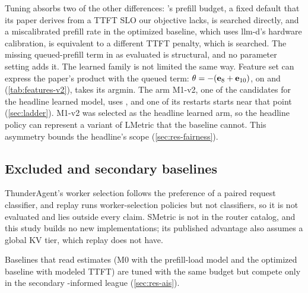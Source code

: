 Tuning absorbs two of the other differences: 's prefill budget, a fixed default that
its paper derives from a TTFT SLO our objective lacks, is searched directly, and a miscalibrated
prefill rate in the optimized baseline, which uses llm-d's hardware calibration, is equivalent to a
different TTFT penalty, which is searched. The missing queued-prefill term in  as
evaluated is structural, and no parameter setting adds it.
The learned family is not limited the same way. Feature set  can express the paper's
product with the queued term: $\theta = -(\mathbf{e}_{8} + \mathbf{e}_{10})$, on  and
 (\cref{tab:features-v2}), takes its argmin. The arm M1-v2, one of the candidates
for the headline learned model, uses , and one of its restarts starts near that point
(\cref{sec:ladder}). M1-v2 was selected as the headline learned arm, so the headline policy can
represent a variant of LMetric that the  baseline cannot. This asymmetry bounds the
headline's scope (\cref{sec:res-fairness}).

\subsection{Excluded and secondary baselines}
\label{sec:excluded}

ThunderAgent's worker selection \citep{kang2026thunderagent} follows the preference of a paired
request classifier, and replay runs worker-selection policies but not classifiers, so it is not
evaluated and lies outside every claim. SMetric \citep{wang2026smetric} is not in the router catalog,
and this study builds no new implementations; its published advantage also assumes a global KV tier,
which replay does not have.

Baselines that read \ais{} estimates (M0 with the \ais{} prefill-load model and the optimized
baseline with modeled TTFT) are tuned with the same budget but compete only in the secondary
\ais{}-informed league (\cref{sec:res-ais}).

